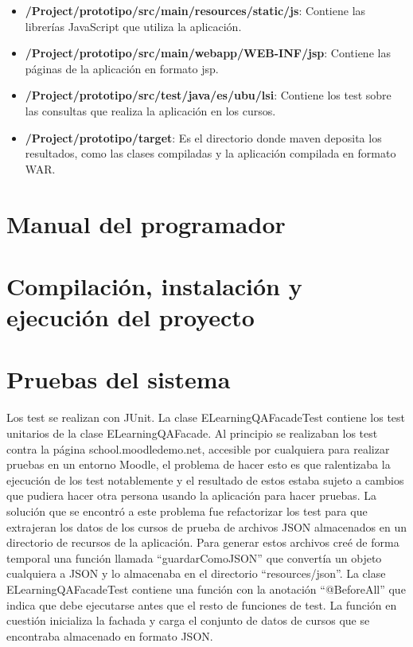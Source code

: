 \begin{itemize}
	\item \textbf{/Project/prototipo/src/main/resources/static/js}: Contiene las librerías JavaScript que utiliza la aplicación.
	\item \textbf{/Project/prototipo/src/main/webapp/WEB-INF/jsp}: Contiene las páginas de la aplicación en formato jsp.
	\item \textbf{/Project/prototipo/src/test/java/es/ubu/lsi}: Contiene los test sobre las consultas que realiza la aplicación en los cursos.
	\item \textbf{/Project/prototipo/target}: Es el directorio donde maven deposita los resultados, como las clases compiladas y la aplicación compilada en formato WAR.
	
\end{itemize}
\section{Manual del programador}

\section{Compilación, instalación y ejecución del proyecto}

\section{Pruebas del sistema}
Los test se realizan con JUnit.
La clase ELearningQAFacadeTest contiene los test unitarios de la clase ELearningQAFacade. Al principio se realizaban los test contra la página school.moodledemo.net, accesible por cualquiera para realizar pruebas en un entorno Moodle, el problema de hacer esto es que ralentizaba la ejecución de los test notablemente y el resultado de estos estaba sujeto a cambios que pudiera hacer otra persona usando la aplicación para hacer pruebas.
La solución que se encontró a este problema fue refactorizar los test para que extrajeran los datos de los cursos de prueba de archivos JSON almacenados en un directorio de recursos de la aplicación. Para generar estos archivos creé de forma temporal una función llamada ``guardarComoJSON'' que convertía un objeto cualquiera a JSON y lo almacenaba en el directorio ``resources/json''.
La clase ELearningQAFacadeTest contiene una función con la anotación ``@BeforeAll'' que indica que debe ejecutarse antes que el resto de funciones de test. La función en cuestión inicializa la fachada y carga el conjunto de datos de cursos que se encontraba almacenado en formato JSON.